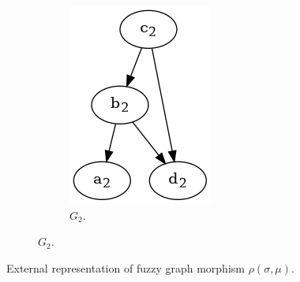 \begin{frame}
\begin{figure}[htbp]
\begin{subfigure}[t]{0.18\textwidth}
\begin{subfigure}[t]{0.8\textwidth}
				\includegraphics[width=\linewidth,valign=t]{inc/fuzzy_graph_theory/fuzzy_graph_morphism_G2.png}
				\caption{$G_2$.}
			\end{subfigure}
		\end{subfigure}
		\caption{External representation of fuzzy graph morphism $\rho(\sigma, \mu)$.}
	\end{figure}
\end{frame}
